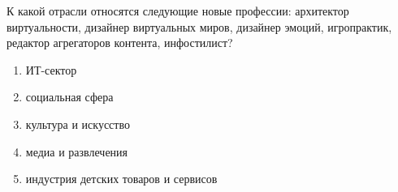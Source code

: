 
К какой отрасли относятся следующие новые профессии: архитектор виртуальности, дизайнер виртуальных миров, дизайнер эмоций, игропрактик, редактор агрегаторов контента, инфостилист?

\begin{enumerate}
    \item ИТ-сектор
    \item социальная сфера
    \item культура и искусство
    \item медиа и развлечения
    \item индустрия детских товаров и сервисов
\end{enumerate}
